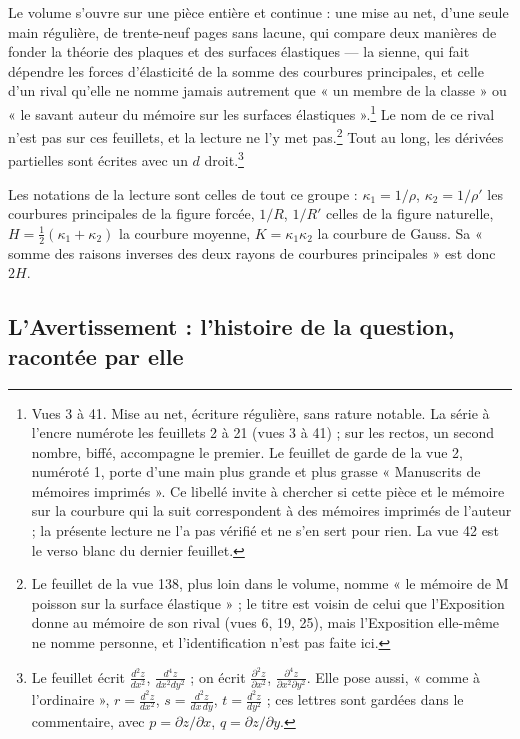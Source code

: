 \documentclass[11pt,a4paper]{article}
\begin{document}
Le volume s'ouvre sur une pièce entière et continue : une mise au net, d'une
seule main régulière, de trente-neuf pages sans lacune, qui compare deux
manières de fonder la théorie des plaques et des surfaces élastiques — la
sienne, qui fait dépendre les forces d'élasticité de la somme des courbures
principales, et celle d'un rival qu'elle ne nomme jamais autrement que « un
membre de la classe » ou « le savant auteur du mémoire sur les surfaces
élastiques ».\footnote{Vues 3 à 41. Mise au net, écriture régulière, sans
rature notable. La série à l'encre numérote les feuillets 2 à 21 (vues 3 à
41) ; sur les rectos, un second nombre, biffé, accompagne le premier. Le
feuillet de garde de la vue 2, numéroté 1, porte d'une main plus grande et plus
grasse « Manuscrits de mémoires imprimés ». Ce libellé invite à chercher si
cette pièce et le mémoire sur la courbure qui la suit correspondent à des
mémoires imprimés de l'auteur ; la présente lecture ne l'a pas vérifié et ne
s'en sert pour rien. La vue 42 est le verso blanc du dernier feuillet.} Le
nom de ce rival n'est pas sur ces feuillets, et la lecture ne l'y met
pas.\footnote{Le feuillet de la vue 138, plus loin dans le volume, nomme « le
mémoire de M poisson sur la surface élastique » ; le titre est voisin de celui
que l'Exposition donne au mémoire de son rival (vues 6, 19, 25), mais
l'Exposition elle-même ne nomme personne, et l'identification n'est pas faite
ici.} Tout au long, les dérivées partielles sont écrites avec un $d$
droit.\footnote{Le feuillet écrit $\frac{d^2z}{dx^2}$, $\frac{d^4z}{dx^2dy^2}$ ;
on écrit $\frac{\partial^2 z}{\partial x^2}$, $\frac{\partial^4 z}{\partial x^2
\partial y^2}$. Elle pose aussi, « comme à l'ordinaire », $r = \frac{d^2
z}{dx^2}$, $s = \frac{d^2 z}{dx\,dy}$, $t = \frac{d^2 z}{dy^2}$ ; ces lettres
sont gardées dans le commentaire, avec $p = \partial z/\partial x$,
$q = \partial z/\partial y$.}

Les notations de la lecture sont celles de tout ce groupe : $\kappa_1 =
1/\rho$, $\kappa_2 = 1/\rho'$ les courbures principales de la figure forcée,
$1/R$, $1/R'$ celles de la figure naturelle, $H = \frac12(\kappa_1+\kappa_2)$
la courbure moyenne, $K = \kappa_1\kappa_2$ la courbure de Gauss. Sa « somme
des raisons inverses des deux rayons de courbures principales » est donc $2H$.

\subsection*{L'Avertissement : l'histoire de la question, racontée par elle}
\end{document}
